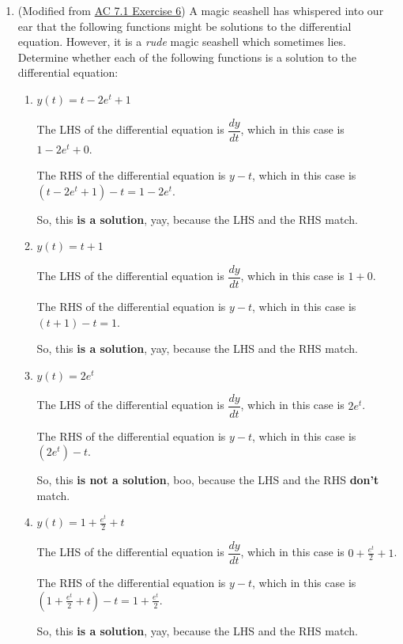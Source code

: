 \documentclass[10pt]{article}
\newenvironment{red}{\color{red}}{\ignorespacesafterend}
\begin{document}
\begin{enumerate}[leftmargin=0pt]
\begin{enumerate}
\end{enumerate}

\item (Modified from \href{https://activecalculus.org/single/sec-7-1-diff-eq-intro.html#mvy}{AC 7.1 Exercise 6}) A magic seashell has whispered into our ear that the following functions might be solutions to the differential equation. However, it is a \textit{rude} magic seashell which sometimes lies. Determine whether each of the following functions is a solution to the differential equation:


\begin{enumerate}
    \item $y(t) = t-2e^t+1$
    
    \begin{red}
    The LHS of the differential equation is $\dfrac{dy}{dt}$, which in this case is $1-2e^t+0$. 
    
    The RHS of the differential equation is $y-t$, which in this case is $\left(t-2e^t+1\right)-t = 1-2e^t$. 
    
    So, this \textbf{is a solution}, yay, because the LHS and the RHS match.
    \end{red}
    \item $y(t) = t+1$
    
    \begin{red}
    The LHS of the differential equation is $\dfrac{dy}{dt}$, which in this case is $1 + 0$. 
    
    The RHS of the differential equation is $y-t$, which in this case is $\left(t+1\right)-t = 1$. 
    
    So, this \textbf{is a solution}, yay, because the LHS and the RHS match.
    \end{red}

    \item $y(t) = 2e^t$

    \begin{red}
    The LHS of the differential equation is $\dfrac{dy}{dt}$, which in this case is $2e^t$. 
    
    The RHS of the differential equation is $y-t$, which in this case is $\left(2e^t\right)-t$. 
    
    So, this \textbf{is not a solution}, boo, because the LHS and the RHS \textbf{don't} match.
    \end{red}
    \item $y(t) = 1+\frac{e^t}{2}+t$
    
    \begin{red}
    The LHS of the differential equation is $\dfrac{dy}{dt}$, which in this case is $0 + \frac{e^t}{2}+1$. 
    
    The RHS of the differential equation is $y-t$, which in this case is $\left(1+\frac{e^t}{2}+t\right)-t = 1+\frac{e^t}{2}$. 
    
    So, this \textbf{is a solution}, yay, because the LHS and the RHS match.
    \end{red}
\end{enumerate}

\end{enumerate}
\end{document}
